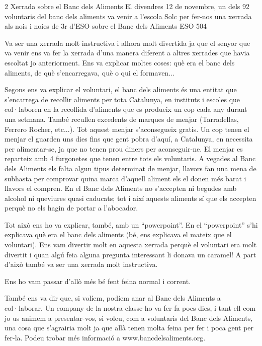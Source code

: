 
\begin{news}
{2} %
{Xerrada sobre el Banc dels Aliments}
{El divendres 12 de novembre,  un dels 92 voluntaris del banc dels aliments va venir a l’escola Solc per fer-nos una xerrada als nois i noies de 3r d’ESO sobre el Banc dels Aliments}
{ESO}
{504} %


Va ser una xerrada molt instructiva i alhora molt divertida ja que el senyor que va venir ens va fer la xerrada d’una manera diferent a altres xerrades que havia escoltat jo anteriorment. Ens va explicar moltes coses: què era el banc dels aliments, de què s’encarregava, què o qui el formaven...

Segons ens va explicar el voluntari, el banc dels aliments és una entitat que s’encarrega de recollir aliments per tota Catalunya, en instituts i escoles que col·laboren en la recollida d’aliments que es produeix un cop cada any durant una setmana. També recullen excedents de marques de menjar (Tarradellas, Ferrero Rocher, etc...). Tot aquest menjar s’aconsegueix gratis. Un cop tenen el menjar el guarden uns dies fins que gent pobra d’aquí, a Catalunya, en necessita per alimentar-se,  ja que no tenen prou diners per aconseguir-ne. El menjar es reparteix amb 4 furgonetes que tenen entre tots els voluntaris. A vegades al Banc dels Aliments els falta algun tipus determinat de menjar, llavors fan una mena de subhasta per comprovar quina marca d’aquell aliment els el donen més barat i llavors el compren. En el Banc dels Aliments no s’accepten ni begudes amb alcohol ni queviures quasi caducats;  tot i així aquests aliments sí que els accepten perquè no els hagin de portar a l’abocador.

Tot això ens  ho va explicar, també,  amb un “powerpoint”. En el “powerpoint” s’hi explicava què era el banc dels aliments (bé, ens explicava el mateix que el voluntari). Ens vam divertir molt en aquesta xerrada perquè el voluntari era molt divertit i quan algú feia alguna pregunta interessant li donava un caramel! A part d’això també va ser una xerrada molt instructiva.

Ens ho vam passar d’allò més bé fent feina normal i corrent.

També ens va dir que, si volíem, podíem anar al Banc dels Aliments a col·laborar. Un company de la nostra classe ho va fer fa pocs dies, i tant ell com jo us animem a presentar-vos, si voleu, com a voluntaris del Banc dels Aliments, una cosa que s’agrairia molt ja que allà tenen molta feina per fer i poca gent per fer-la. Podeu trobar més informació a www.bancdelsaliments.org.


\end{news}
